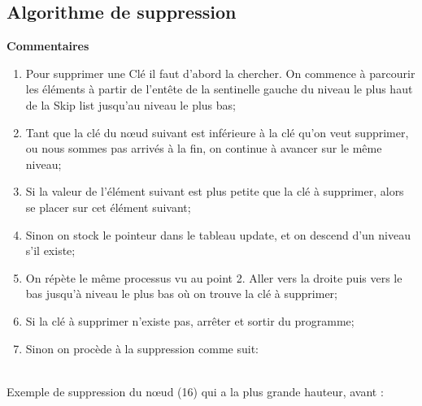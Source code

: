 \documentclass[hidelinks,a4paper,12pt]{article}
\begin{document}
\subsection{Algorithme de suppression}
\textbf {Commentaires} 
\begin{enumerate}
\item Pour supprimer une Clé il faut d’abord la chercher. On commence à parcourir les éléments à partir de l’entête de la sentinelle gauche du niveau le plus haut de la Skip list jusqu'au niveau le plus bas;

\item Tant que la clé du nœud suivant est inférieure à la clé qu’on veut supprimer, ou nous sommes pas arrivés à la fin, on continue à avancer sur le même niveau; 

\item Si la valeur de l’élément suivant est plus petite que la clé à supprimer, alors se placer sur cet élément suivant;

\item Sinon on stock le pointeur dans le tableau update, et on descend d’un niveau s’il existe;

\item On répète le même processus vu au point 2. Aller vers la droite puis vers le bas jusqu’à niveau le plus bas où on trouve la clé à supprimer;

\item Si la clé à supprimer n'existe pas, arrêter et sortir du programme;

\item Sinon on procède à la suppression comme suit:
\end{enumerate}


~\\
Exemple de suppression du nœud (16) qui a la plus grande hauteur, avant :
\end{document}
